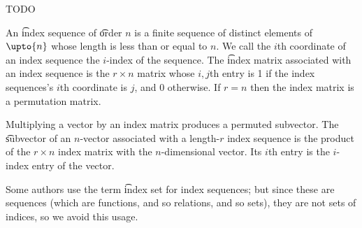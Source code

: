 
\sbasic





































\sstart
{}


TODO


An \t{index sequence} of \t{order} $n$ is a finite sequence of distinct elements of $\upto{n}$ whose length is less than or equal to $n$.
We call the $i$th coordinate of an index sequence the \t{$i$-index} of the sequence.
The \t{index matrix} associated with an index sequence is the $r \times n$ matrix whose $i,j$th entry is 1 if the index sequences's $i$th coordinate is $j$, and $0$ otherwise.
If $r = n$ then the index matrix is a permutation matrix.

Multiplying a vector by an index matrix produces a permuted subvector.
The \t{subvector} of an $n$-vector {associated with} a length-$r$ index sequence is the product of the $r \times n$ index matrix with the $n$-dimensional vector.
Its $i$th entry is the $i$-index entry of the vector.

Some authors use the term \t{index set} for index sequences; but since these are sequences (which are functions, and so relations, and so sets), they are not sets of indices, so we avoid this usage.

